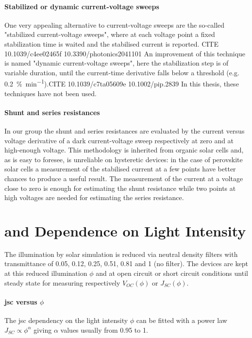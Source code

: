 \paragraph{Stabilized or dynamic current-voltage sweeps}
One very appealing alternative to current-voltage sweeps are the so-called "stabilized current-voltage sweeps", where at each voltage point a fixed stabilization time is waited and the stabilised current is reported. CITE 10.1039/c4ee02465f 10.3390/photonics2041101
An improvement of this technique is named "dynamic current-voltage sweeps", here the stabilization step is of variable duration, until the current-time derivative falls below a threshold (e.g. \SI{0.2}{\%\per\minute}).CITE 10.1039/c7ta05609e 10.1002/pip.2839
In this thesis, these techniques have not been used.

\paragraph{Shunt and series resistances} \label{resistances} In our group the shunt and series resistances are evaluated by the current versus voltage derivative of a dark current-voltage sweep respectively at zero and at high-enough voltage. This methodology is inherited from organic solar cells and, as is easy to foresee, is unreliable on hysteretic devices: in the case of perovskite solar cells a measurement of the stabilised current at a few points have better chances to produce a useful result. The measurement of the current at a voltage close to zero is enough for estimating the shunt resistance while two points at high voltages are needed for estimating the series resistance.

\section{ and  Dependence on Light Intensity}
The illumination by solar simulation is reduced via neutral density filters with transmittance of 0.05, 0.12, 0.25, 0.51, 0.81 and 1 (no filter). The devices are kept at this reduced illumination $\phi$ and at open circuit or short circuit conditions until steady state for measuring respectively $V_{OC}(\phi)$ or $J_{SC}(\phi)$.

\paragraph{\Gls{jsc} versus $\phi$}\label{methods_jsc_intensity} The \gls{jsc} dependency on the light intensity $\phi$ can be fitted with a power law $J_{SC} \propto \phi^\alpha$ giving $\alpha$ values usually from 0.95 to 1.

